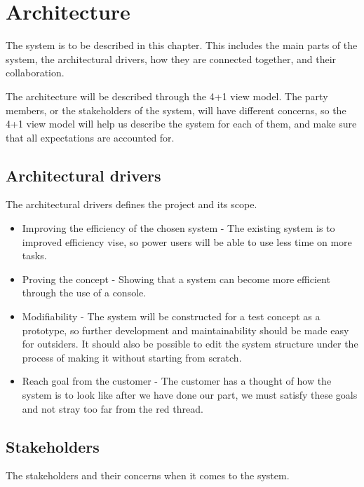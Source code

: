 \section{Architecture}
The system is to be described in this chapter. This includes the main parts of the system, the architectural drivers, how they are connected together, and their collaboration. 

The architecture will be described through the 4+1 view model. The party members, or the stakeholders of the system, will have different concerns, so the 4+1 view model will help us describe the system for each of them, and make sure that all expectations are accounted for.  


\subsection{Architectural drivers}
The architectural drivers defines the project and its scope. 
\begin{itemize}{labelitemi}{$\bullet$}
\item Improving the efficiency of the chosen system - The existing system is to improved efficiency vise, so power users will be able to use less time on more tasks. 
\item Proving the concept - Showing that a system can become more efficient through the use of a console. 
\item Modifiability - The system will be constructed for a test concept as a prototype, so further development and maintainability should be made easy for outsiders. It should also be possible to edit the system structure under the process of making it without starting from scratch. 
\item Reach goal from the customer - The customer has a thought of how the system is to look like after we have done our part, we must satisfy these goals and not stray too far from the red thread.  
\end{itemize}


\subsection{Stakeholders}
The stakeholders and their concerns when it comes to the system.


